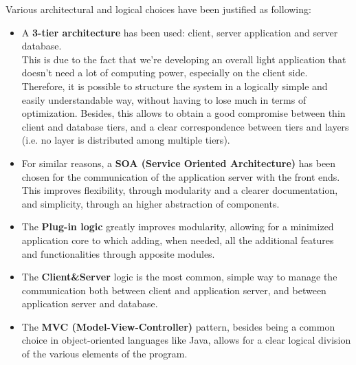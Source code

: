 Various architectural and logical choices have been justified as following:

\begin{itemize}
	
	\item A \textbf{3-tier architecture} has been used: client, server application and server database.\\
	This is due to the fact that we're developing an overall light application that doesn't need a lot of computing power, especially on the client side. Therefore, it is possible to structure the system in a logically simple and easily understandable way, without having to lose much in terms of optimization. Besides, this allows to obtain a good compromise between thin client and database tiers, and a clear correspondence between tiers and layers (i.e. no layer is distributed among multiple tiers).
	
	\item For similar reasons, a \textbf{SOA (Service Oriented Architecture)} has been chosen for the communication of the application server with the front ends. This improves flexibility, through modularity and a clearer documentation, and simplicity, through an higher abstraction of components.
	
	\item The \textbf{Plug-in logic} greatly improves modularity, allowing for a minimized application core to which adding, when needed, all the additional features and functionalities through apposite modules.
	
	\item The \textbf{Client\&Server} logic is the most common, simple way to manage the communication both between client and application server, and between application server and database.
	
	\item The \textbf{MVC (Model-View-Controller)} pattern, besides being a common choice in object-oriented languages like Java, allows for a clear logical division of the various elements of the program.
	
\end{itemize}